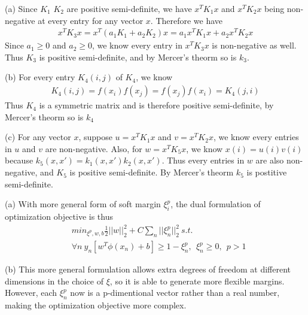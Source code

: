 \documentclass[12pt]{article}
\newenvironment{problem}[2][Problem]{\begin{trivlist}
\item[\hskip \labelsep {\bfseries #1}\hskip \labelsep {\bfseries #2}]}{\end{trivlist}}
\begin{document}
\begin{problem}{3. Kernels}
\item{(a)}
Since $K_1$ $K_2$ are positive semi-definite, we have $x^TK_1x$ and $x^TK_2x$ being non-negative at every entry for any vector $x$. Therefore we have
\begin{align*}
x^TK_3x = x^T(a_1K_1 + a_2K_2)x = a_1x^TK_1x + a_2x^TK_2x
\end{align*}
Since $a_1 \geq 0$ and $a_2 \geq 0$, we know every entry in $x^TK_3x$ is non-negative as well. Thus $K_3$ is positive semi-definite, and by Mercer's theorm so is $k_3$.
\\
\item{(b)} 
For every entry $K_4(i, j)$ of $K_4$, we know
\begin{align*}
K_4(i, j) = f(x_i)f(x_j) = f(x_j)f(x_i) = K_4(j, i)
\end{align*}
Thus $K_4$ is a symmetric matrix and is therefore positive semi-definite, by Mercer's theorm so is $k_4$
\item{(c)}
For any vector $x$, suppose $u = x^TK_1x$ and $v = x^TK_2x$, we know every entries in $u$ and $v$ are non-negative. Also, for $w = x^TK_5x$, we know $x(i) = u(i)v(i)$ because $k_5(x, x') = k_1(x, x')k_2(x, x')$. Thus every entries in $w$ are also non-negative, and $K_5$ is positive semi-definite. By Mercer's theorm $k_5$ is postitive semi-definite.
\end{problem}

\begin{problem}{4. Soft Margin Hyperplanes}
\item{(a)} With more general form of soft margin $\xi_i^p$, the dual formulation of optimization objective is thus
\begin{align*}
	&min_{\xi^p, w, b} \frac{1}{2}||w||_2^2 + C\sum_n||\xi_n^p||_2^2 \ s.t.\\
	&\forall n \ y_n[w^T\phi(x_n)+b] \geq 1 - \xi_n^p, \ \ \xi_n^p \geq 0, \ \ p > 1
\end{align*}
\item{(b)}
This more general formulation allows extra degrees of freedom at different dimensions in the choice of $\xi$, so it is able to generate more flexible margins. However, each $\xi_n^p$ now is a p-dimentional vector rather than a real number, making the optimization objective more complex.
\end{problem}
\end{document}
